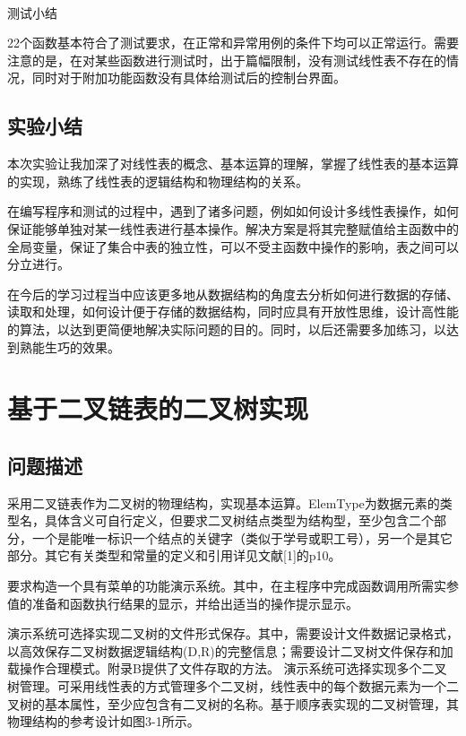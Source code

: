 \documentclass[supercite]{Experimental_Report}
\newcommand{\whiteding}[1]{\ding{\numexpr171+#1\relax}}
\theoremstyle{definition}
\begin{document}
~\

测试小结

22个函数基本符合了测试要求，在正常和异常用例的条件下均可以正常运行。需要注意的是，在对某些函数进行测试时，出于篇幅限制，没有测试线性表不存在的情况，同时对于附加功能函数没有具体给测试后的控制台界面。

\subsection{实验小结}

本次实验让我加深了对线性表的概念、基本运算的理解，掌握了线性表的基本运算的实现，熟练了线性表的逻辑结构和物理结构的关系。

在编写程序和测试的过程中，遇到了诸多问题，例如如何设计多线性表操作，如何保证能够单独对某一线性表进行基本操作。解决方案是将其完整赋值给主函数中的
全局变量，保证了集合中表的独立性，可以不受主函数中操作的影响，表之间可以分立进行。

在今后的学习过程当中应该更多地从数据结构的角度去分析如何进行数据的存储、读取和处理，如何设计便于存储的数据结构，同时应具有开放性思维，设计高性能的算法，以达到更简便地解决实际问题的目的。同时，以后还需要多加练习，以达到熟能生巧的效果。


\newpage

\section{基于二叉链表的二叉树实现}

\subsection{问题描述}

采用二叉链表作为二叉树的物理结构，实现基本运算。ElemType为数据元素的类型名，具体含义可自行定义，但要求二叉树结点类型为结构型，至少包含二个部分，一个是能唯一标识一个结点的关键字（类似于学号或职工号），另一个是其它部分。其它有关类型和常量的定义和引用详见文献[1]的p10。

要求构造一个具有菜单的功能演示系统。其中，在主程序中完成函数调用所需实参值的准备和函数执行结果的显示，并给出适当的操作提示显示。

演示系统可选择实现二叉树的文件形式保存。其中，\whiteding{1}需要设计文件数据记录格式，以高效保存二叉树数据逻辑结构(D,{R})的完整信息；\whiteding{2}需要设计二叉树文件保存和加载操作合理模式。附录B提供了文件存取的方法。
演示系统可选择实现多个二叉树管理。可采用线性表的方式管理多个二叉树，线性表中的每个数据元素为一个二叉树的基本属性，至少应包含有二叉树的名称。基于顺序表实现的二叉树管理，其物理结构的参考设计如图3-1所示。
\end{document}
